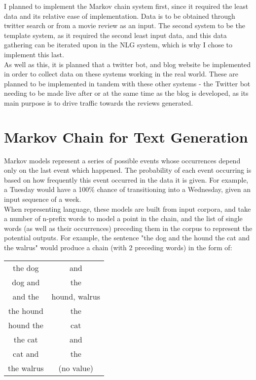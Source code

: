 I planned to implement the Markov chain system first, since it required the least data and its relative ease of implementation. Data is to be obtained through twitter search or from a movie review as an input. The second system to be the template system, as it required the second least input data, and this data gathering can be iterated upon in the NLG system, which is why I chose to implement this last.\\

As well as this, it is planned that a twitter bot, and blog website be implemented in order to collect data on these systems working in the real world. These are planned to be implemented in tandem with these other systems - the Twitter bot needing to be made live after or at the same time as the blog is developed, as its main purpose is to drive traffic towards the reviews generated.\\

\section{Markov Chain for Text Generation}
Markov models represent a series of possible events whose occurrences depend only on the last event which happened. The probability of each event occurring is based on how frequently this event occurred in the data it is given. For example, a Tuesday would have a 100\% chance of transitioning into a Wednesday, given an input sequence of a week.\\
When representing language, these models are built from input corpora, and take a number of n-prefix words to model a point in the chain, and the list of single words (as well as their occurrences) preceding them in the corpus to represent the potential outputs. For example, the sentence "the dog and the hound the cat and the walrus" would produce a chain (with 2 preceding words) in the form of:


\begin{center}
	\begin{tabular}{ |c|c| } 
		\hline
		the dog & and \\ 
		dog and & the\\ 
		and the & hound, walrus\\ 
		the hound & the\\
		hound the & cat\\
		the cat & and\\
		cat and & the \\
		the walrus & (no value)\\
		\hline
	\end{tabular}
\end{center}

